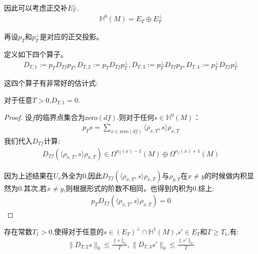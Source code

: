因此可以考虑正交补$E_T^{\perp}$.
\begin{align*}
	\mathbb{H}^0(M)=E_T \oplus E_T^{\perp}
\end{align*}

再设$p_T$和$p_T^{\perp}$是对应的正交投影。

\begin{definition}[Witten形变算子]
	定义如下四个算子。
	\begin{align}
		D_{T,1}:=p_T D_{Tf}p_T,D_{T,2}:=p_T D_{Tf} p_T^{\perp},D_{T,3}:=p_T^{\perp} D_{Tf}p_T,D_{T,4}:=p_T^{\perp} D_{Tf}p_T^{\perp}
	\end{align}
	
\end{definition}

这四个算子有非常好的估计式:
\begin{proposition}
	对于任意$T>0$,$D_{T,1}=0$.
\end{proposition}
\begin{proof}
	设$f$的临界点集合为$\mathrm{zero}(df)$.则对于任何$s \in \mathbb{H}^0(M)$：
	\begin{align*}
		p_T s=\sum_{x \in \mathrm{zero}(df)}\langle \rho_{x,T},s\rangle\rho_{x,T}
	\end{align*}
	我们代入$D_{Tf}$计算:
	\begin{align}
		D_{Tf}(\langle \rho_{x,T},s\rangle\rho_{x,T}) \in \Omega^{n_f(x)-1}(M)\oplus \Omega^{n_f(x)+1}(M)
	\end{align}

	因为上述结果在$U_x$外全为$0$,因此$D_{Tf}(\langle \rho_{x,T},s\rangle\rho_{x,T})$与$\rho_{y,T}$在$x\neq y$的时候做内积显然为$0$.其次,若$x \neq y$,则根据形式的阶数不相同，也得到内积为$0$.综上:
	\begin{align}
		p_T D_{Tf}(\langle \rho_{x,T},s\rangle\rho_{x,T})=0
	\end{align}
\end{proof}
\begin{proposition}
	存在常数$T_1>0$,使得对于任意的$s \in (E_T)^{\perp} \cap \mathbb{H}^1(M)$,$s' \in E_T$和$T \geq T_1$,有:
	\begin{align}
		\|D_{T,2}s\|_0\leq 
	\frac{\|s\|_0}{T},\|D_{T,3}s'\|_0\leq \frac{\|s'\|_0}{T}
	\end{align}
\end{proposition}
